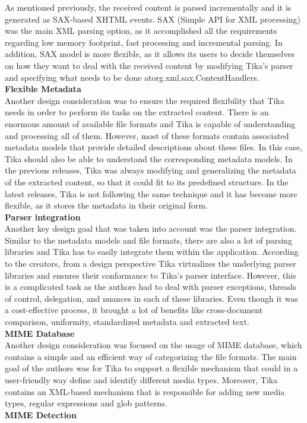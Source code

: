 \documentclass{article}
\begin{document}
As mentioned previously, the received content is parsed incrementally and it is generated as SAX-based XHTML events. SAX (Simple API for XML processing) was the main XML parsing option, as it accomplished all the requirements regarding low memory footprint, fast processing and incremental parsing. In addition, SAX model is more flexible, as it allows its users to decide themselves on how they want to deal with the received content by modifying Tika’s parser and specifying what needs to be done atorg.xml.sax.ContentHandlers.\\

\textbf{Flexible Metadata}\\

Another design consideration was to ensure the required flexibility that Tika needs in order to perform its tasks on the extracted content. There is an enormous amount of available file formats and Tika is capable of understanding and processing all of them. However, most of these formats contain associated metadata models that provide detailed descriptions about these files. In this case, Tika should also be able to understand the corresponding metadata models. In the previous releases, Tika was always modifying and generalizing the metadata of the extracted content, so that it could fit to its predefined structure. In the latest releases, Tika is not following the same technique and it has become more flexible, as it stores the metadata in their original form. \\

\textbf{Parser integration}\\

Another key design goal that was taken into account was the parser integration. Similar to the metadata models and file formats, there are also a lot of parsing libraries and Tika has to easily integrate them within the application. According to the creators, from a design perspective Tika virtualizes the underlying parser libraries and ensures their conformance to Tika’s parser interface. However, this is a complicated task as the authors had to deal with parser exceptions, threads of control, delegation, and nuances in each of these libraries. Even though it was a cost-effective process, it brought a lot of benefits like cross-document comparison, uniformity, standardized metadata and extracted text.\\

\textbf{MIME Database}\\

Another design consideration was focused on the usage of MIME database, which contains a simple and an efficient way of categorizing the file formats. The main goal of the authors was for Tika to support a flexible mechanism that could in a user-friendly way define and identify different media types. Moreover, Tika contains an XML-based mechanism that is responsible for adding new media types, regular expressions and glob patterns.\\
\textbf{MIME Detection}\\
\end{document}
